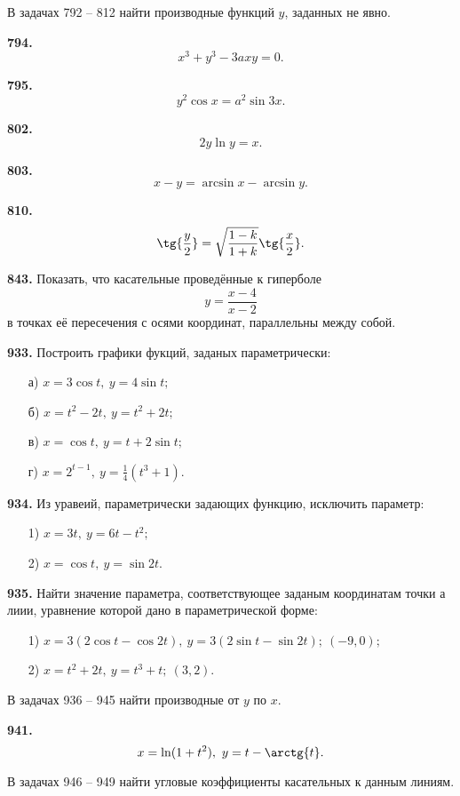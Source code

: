 \documentclass[a4paper,10pt]{article}
\newcommand{\exercize}[1]{\textbf{#1.}}
\begin{document}
В задачах 792 -- 812 найти производные функций $y$, заданных не явно.

\exercize{794} \[ x^3 + y^3 - 3 a x y = 0. \]

\exercize{795} \[ y^2 \cos{x} = a^2 \sin{3x}. \]

\exercize{802} \[ 2 y \ln{y} = x. \]

\exercize{803} \[ x - y = \arcsin{x} - \arcsin{y}. \]

\exercize{810} \[ \tg{\frac{y}{2}} = \sqrt{\frac{1 - k}{1 + k}} \tg{\frac{x}{2}}. \]

\exercize{843} Показать, что касательные проведённые к гиперболе
\[ y = \frac{x - 4}{x - 2} \]
в точках её пересечения с осями координат, параллельны между собой.

\exercize{933} Построить графики фукций, заданых параметрически:
\begin{itemize}
\item[а)] $x = 3 \cos{t},\ y = 4 \sin{t};$
\item[б)] $x = t^2 - 2 t,\ y = t^2 + 2 t;$
\item[в)] $x = \cos{t},\ y = t + 2 \sin{t};$
\item[г)] $x = 2^{t - 1},\ y = \frac{1}{4}(t^3 + 1).$
\end{itemize}

\exercize{934} Из уравеий, параметрически задающих функцию, исключить параметр:
\begin{itemize}
\item[1)] $x = 3 t,\ y = 6 t - t^2;$
\item[2)] $x = \cos{t},\ y = \sin{2 t}.$
\end{itemize}

\exercize{935} Найти значение параметра, соответствующее заданым координатам точки а лиии, уравнение которой дано в параметрической форме:
\begin{itemize}
\item[1)] $x = 3 (2 \cos{t} - \cos{2 t}),\ y = 3 (2 \sin{t} - \sin{2t});\ (-9, 0);$
\item[2)] $x = t^2 + 2t,\ y = t^3 + t;\ (3, 2).$
\end{itemize}

В задачах 936 -- 945 найти производные от $y$ по $x.$

\exercize{941} \[ x = \ln(1 + t^2),\ y = t - \arctg{t}. \]

В задачах 946 -- 949 найти угловые коэффициенты касательных к данным линиям.

\nopagebreak
\end{document}
